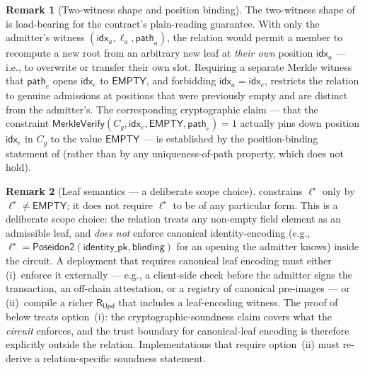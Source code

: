 \documentclass[11pt,a4paper]{article}
\theoremstyle{plain}
\theoremstyle{definition}
\newtheorem{remark}{Remark}
\newcommand{\Cg}{C_g}
\newcommand{\RUpd}{\mathsf{R}_{\mathsf{Upd}}}
\newcommand{\Poseidon}{\mathsf{Poseidon2}}
\newcommand{\Empty}{\mathsf{EMPTY}}
\newcommand{\MerkleVerify}{\mathsf{MerkleVerify}}
\newcommand{\Idx}{\mathsf{idx}}
\newcommand{\Pth}{\mathsf{path}}
\begin{document}
\begin{remark}[Two-witness shape and position binding]
\label{rem:slot}
The two-witness shape of  is load-bearing for the
contract's plain-reading guarantee. With only the admitter's
witness $(\Idx_a, \ell_a, \Pth_a)$, the relation would permit a
member to recompute a new root from an arbitrary new leaf at
\emph{their own} position $\Idx_a$ --- i.e., to overwrite or
transfer their own slot. Requiring a separate
Merkle witness that $\Pth_e$ opens $\Idx_e$ to $\Empty$, and
forbidding $\Idx_a = \Idx_e$, restricts the relation to genuine
admissions at positions that were previously empty and are
distinct from the admitter's. The corresponding cryptographic
claim --- that the constraint
$\MerkleVerify(\Cg, \Idx_e, \Empty, \Pth_e) = 1$ actually pins
down position $\Idx_e$ in $\Cg$ to the value $\Empty$ --- is
established by the position-binding statement of
 (rather than by any uniqueness-of-path
property, which does not hold).
\end{remark}

\begin{remark}[Leaf semantics --- a deliberate scope choice]
\label{rem:leaf-scope}
 constrains $\ell^{\star}$ only by
$\ell^{\star} \ne \Empty$; it does not require $\ell^{\star}$ to
be of any particular form. This is a deliberate scope choice: the
relation treats any non-empty field element as an admissible
leaf, and \emph{does not} enforce canonical identity-encoding
(e.g., $\ell^{\star} = \Poseidon(\mathsf{identity\_pk},
\mathsf{blinding})$ for an opening the admitter knows) inside
the circuit. A deployment that requires canonical leaf encoding
must either (i)~enforce it externally --- e.g., a client-side
check before the admitter signs the transaction, an off-chain
attestation, or a registry of canonical pre-images --- or
(ii)~compile a richer $\RUpd$ that includes a leaf-encoding
witness. The proof of  below treats option~(i):
the cryptographic-soundness claim covers what the
\emph{circuit} enforces, and the trust boundary for
canonical-leaf encoding is therefore explicitly outside the
relation. Implementations that require option~(ii) must
re-derive a relation-specific soundness statement.
\end{remark}
\end{document}
